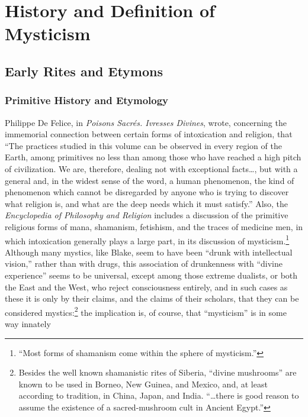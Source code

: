 \chapter{History and Definition of Mysticism}

\section{Early Rites and Etymons}

\subsection{Primitive History and Etymology}

Philippe De Felice, in \emph{Poisons Sacrés. Ivresses Divines},
wrote, concerning the immemorial connection between certain
forms of intoxication and religion, that \enquote{The practices
studied in this volume can be observed in every region of
the Earth, among primitives no less than among those who
have reached a high pitch of civilization. We are, therefore,
dealing not with exceptional facts\dots, but with a general
and, in the widest sense of the word, a human phenomenon, the
kind of phenomenon which cannot be disregarded by anyone who
is trying to discover what religion is, and what are the
deep needs which it must satisfy.} Also, the \emph{Encyclopedia
of Philosophy and Religion} includes a discussion of the
primitive religious forms of mana, shamanism, fetishism, and
the traces of medicine men, in which intoxication generally
plays a large part, in its discussion of mysticism.\footnote{\enquote{Most forms of shamanism come within the sphere of mysticism.}\supercite{hastings:philosophy-religion}}
Although many mystics, like Blake, seem to have been \enquote{drunk with
intellectual vision,} rather than with drugs, this association
of drunkenness with \enquote{divine experience} seems to be universal,
except among those extreme dualists, or both the East and the
West, who reject consciousness entirely, and in such cases as
these it is only by their claims, and the claims of their
scholars, that they can be considered mystics:\footnote{Besides the well known shamanistic rites of Siberia, \enquote{divine mushrooms} are known to be used in Borneo, New Guinea, and Mexico, and, at least according to tradition, in China, Japan, and India.\supercite{deropp:drugs-mind, wasson:magic-mushroom} \enquote{\dots there is good reason to assume the existence of a sacred-mushroom cult in Ancient Egypt.}\supercite{puharich:sacred-mushroom}}
the implication is, of course, that \enquote{mysticism} is in some way innately
